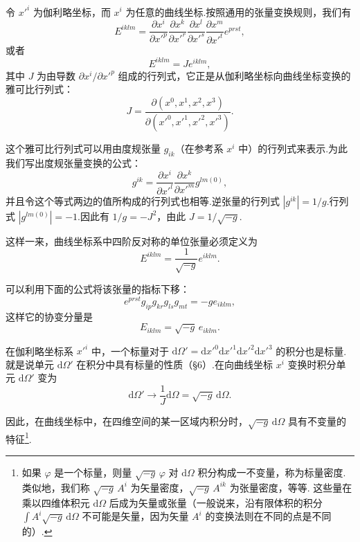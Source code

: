 令 $x'^i$ 为伽利略坐标，而 $x^i$ 为任意的曲线坐标.按照通用的张量变换规则，我们有
\begin{equation*}
  E^{iklm}=\frac{\partial x^i}{\partial x'^p}
  \frac{\partial x^k}{\partial x'^r}
  \frac{\partial x^l}{\partial x'^s}
  \frac{\partial x^m}{\partial x'^t}e^{prst},
\end{equation*}
或者
\begin{equation*}
  E^{iklm}=Je^{iklm},
\end{equation*}
其中 $J$ 为由导数 $\partial x^i/\partial x'^p$ 组成的行列式，它正是从伽利略坐标向曲线坐标变换的雅可比行列式：
\begin{equation*}
  J=\frac{\partial(x^0,x^1,x^2,x^3)}
  {\partial(x'^0,x'^1,x'^2,x'^3)}.
\end{equation*}

这个雅可比行列式可以用由度规张量 $g_{ik}$（在参考系 $x^i$ 中）的行列式来表示.为此我们写出度规张量变换的公式：
\begin{equation*}
  g^{ik}=\frac{\partial x^i}{\partial x'^l}
  \frac{\partial x^k}{\partial x'^m}g^{lm(0)},
\end{equation*}
并且令这个等式两边的值所构成的行列式也相等.逆张量的行列式 $|g^{ik}|=1/g$.行列式 $|g^{lm(0)}|=-1$.因此有 $1/g=-J^2$，由此 $J=1/\sqrt{-g}$.

这样一来，曲线坐标系中四阶反对称的单位张量必须定义为
\begin{equation}
  E^{iklm}=\frac{1}{\sqrt{-g}}e^{iklm}.
\end{equation}

可以利用下面的公式将该张量的指标下移：
\begin{equation*}
  e^{prst}g_{ip}g_{kr}g_{ls}g_{mt}=-ge_{iklm},
\end{equation*}
这样它的协变分量是
\begin{equation}
  E_{iklm}=\sqrt{-g}\,e_{iklm}.
\end{equation}

在伽利略坐标系 $x'^i$ 中，一个标量对于 $\mathrm{d}\varOmega'=\mathrm{d}x'^0\mathrm{d}x'^1\mathrm{d}x'^2\mathrm{d}x'^3$ 的积分也是标量.就是说单元 $\mathrm{d}\varOmega'$ 在积分中具有标量的性质（§6）.在向曲线坐标 $x^i$ 变换时积分单元 $\mathrm{d}\varOmega'$ 变为
\begin{equation*}
  \mathrm{d}\varOmega'\to\frac{1}{J}\mathrm{d}\varOmega
  =\sqrt{-g}\,\mathrm{d}\varOmega.
\end{equation*}

因此，在曲线坐标中，在四维空间的某一区域内积分时，$\sqrt{-g}\,\mathrm{d}\varOmega$ 具有不变量的特征\footnote{如果 $\varphi$ 是一个标量，则量 $\sqrt{-g}\,\varphi$ 对 $\mathrm{d}\varOmega$ 积分构成一不变量，称为标量密度. 类似地，我们称 $\sqrt{-g}\,A^i$ 为矢量密度，$\sqrt{-g}\,A^{ik}$ 为张量密度，等等. 这些量在乘以四维体积元 $\mathrm{d}\varOmega$ 后成为矢量或张量（一般说来，沿有限体积的积分 $\int A^i\sqrt{-g}\,\mathrm{d}\varOmega$ 不可能是矢量，因为矢量 $A^i$ 的变换法则在不同的点是不同的）.}.

